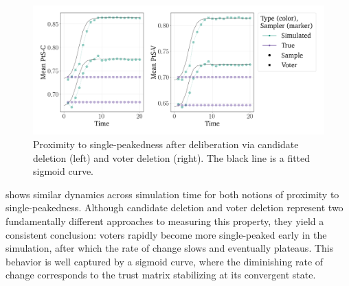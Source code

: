 \begin{figure}[htbp]
	\centering
	\vspace{-9pt}
	\includegraphics[width=\textwidth]{Figures/pst_measures.png}
	\caption{Proximity to single-peakedness after deliberation via candidate deletion (left) and voter deletion (right). The black line is a fitted sigmoid curve.}
	\label{fig:degroot_single_peaked}
\end{figure}

 shows similar dynamics across simulation time for both notions of proximity to single-peakedness. Although candidate deletion and voter deletion represent two fundamentally different approaches to measuring this property, they yield a consistent conclusion: voters rapidly become more single-peaked early in the simulation, after which the rate of change slows and eventually plateaus. This behavior is well captured by a sigmoid curve, where the diminishing rate of change corresponds to the trust matrix stabilizing at its convergent state.
